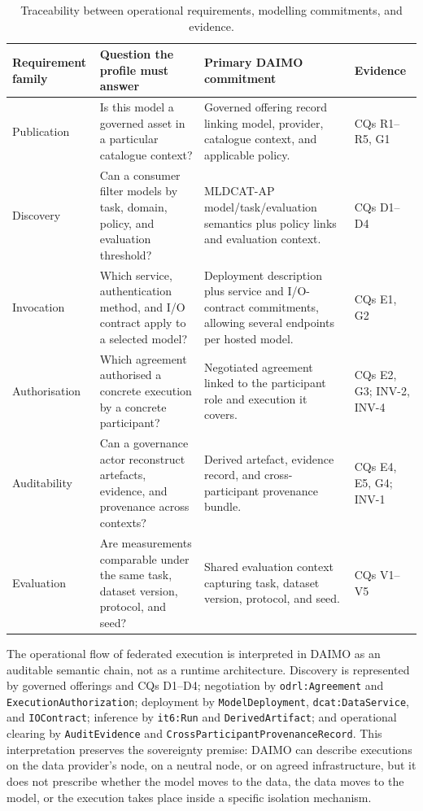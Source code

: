 \documentclass[Afour,sagev,times]{sagej}
\newcommand{\code}[1]{\texttt{#1}}
\begin{document}
\begin{table}[tb]
\small\sf\centering
\caption{Traceability between operational requirements, modelling commitments, and evidence.\label{tab:req-trace}}
\begin{tabular}{@{}p{3.2cm}p{4.3cm}p{4.2cm}p{2.8cm}@{}}
\toprule
\textbf{Requirement family} & \textbf{Question the profile must answer} & \textbf{Primary DAIMO commitment} & \textbf{Evidence} \\
\midrule
Publication & Is this model a governed asset in a particular catalogue context? & Governed offering record linking model, provider, catalogue context, and applicable policy. & CQs R1--R5, G1 \\
Discovery & Can a consumer filter models by task, domain, policy, and evaluation threshold? & MLDCAT-AP model/task/evaluation semantics plus policy links and evaluation context. & CQs D1--D4 \\
Invocation & Which service, authentication method, and I/O contract apply to a selected model? & Deployment description plus service and I/O-contract commitments, allowing several endpoints per hosted model. & CQs E1, G2 \\
Authorisation & Which agreement authorised a concrete execution by a concrete participant? & Negotiated agreement linked to the participant role and execution it covers. & CQs E2, G3; INV-2, INV-4 \\
Auditability & Can a governance actor reconstruct artefacts, evidence, and provenance across contexts? & Derived artefact, evidence record, and cross-participant provenance bundle. & CQs E4, E5, G4; INV-1 \\
Evaluation & Are measurements comparable under the same task, dataset version, protocol, and seed? & Shared evaluation context capturing task, dataset version, protocol, and seed. & CQs V1--V5 \\
\bottomrule
\end{tabular}
\end{table}

The operational flow of federated execution is interpreted in DAIMO as an auditable semantic chain, not as a runtime architecture. Discovery is represented by governed offerings and CQs D1--D4; negotiation by \code{odrl:Agreement} and \code{ExecutionAuthorization}; deployment by \code{ModelDeployment}, \code{dcat:DataService}, and \code{IOContract}; inference by \code{it6:Run} and \code{DerivedArtifact}; and operational clearing by \code{AuditEvidence} and \code{CrossParticipantProvenanceRecord}. This interpretation preserves the sovereignty premise: DAIMO can describe executions on the data provider's node, on a neutral node, or on agreed infrastructure, but it does not prescribe whether the model moves to the data, the data moves to the model, or the execution takes place inside a specific isolation mechanism.
\end{document}
